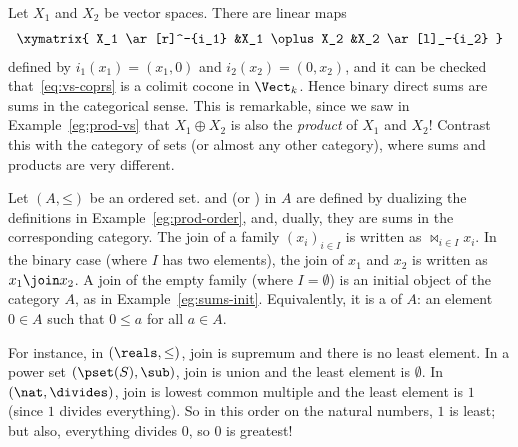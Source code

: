 \begin{example}
Let $X_1$ and $X_2$ be vector%
%
%
spaces.  There are linear maps
%
\begin{equation}        
\label{eq:vs-coprs}
\begin{array}{c}
\xymatrix{
X_1 \ar[r]^-{i_1} &X_1 \oplus X_2        &X_2 \ar[l]_-{i_2}
}
\end{array}
\end{equation}
% 
defined by $i_1(x_1) = (x_1, 0)$ and $i_2(x_2) = (0, x_2)$, and it can be
checked that~\eqref{eq:vs-coprs} is a colimit cocone in $\Vect_k$.  Hence
binary direct%
%
%
sums are sums in the categorical sense.  This is remarkable,
since we saw in Example~\ref{eg:prod-vs} that $X_1 \oplus X_2$ is also the
\emph{product} of $X_1$ and $X_2$!  Contrast this with the category of sets
(or almost any other category), where sums and products are very different.
\end{example}

\begin{example}
Let $(A, \mathord{\leq})$ be an ordered set.%
%
%
 and  (or )%
%
%
in $A$ are defined by dualizing the definitions in
Example~\ref{eg:prod-order}, and, dually, they are sums in the corresponding
category.  The join of a family $(x_i)_{i \in I}$ is written as $\Join_{\! i
\in I} x_i$.%
%
%
In the binary case (where $I$ has two elements), the join of $x_1$ and
$x_2$ is written as $x_1 \join x_2$.%
%
%
A join of the empty family (where $I = \emptyset$) is an initial
object of the category $A$, as in Example~\ref{eg:sums-init}.
Equivalently, it is a  of $A$: an element $0 \in A$ such that $0 \leq a$ for all $a \in
A$.

For instance, in $(\reals, \mathord{\leq})$, join is supremum%
%
%
and there is no least element.  In a power%
%
%
set $(\pset(S), \sub)$, join is union%
%
%
and the least element is $\emptyset$.  In $(\nat, \divides)$, join is
lowest%
%
%
common multiple and the least element is $1$ (since $1$ divides
everything).  So in this order on the natural numbers, $1$ is least; but
also, everything divides $0$, so $0$ is greatest!
\end{example}


